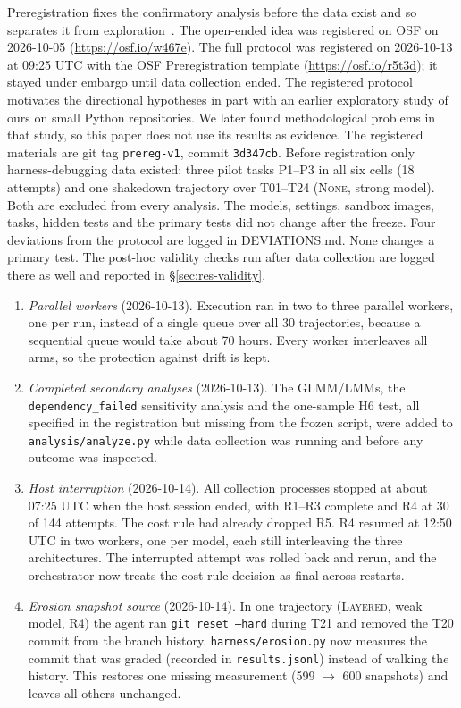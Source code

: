 \documentclass[10pt]{article}
\newcommand{\NONE}{\textsc{None}}
\newcommand{\LAY}{\textsc{Layered}}
\newcommand{\code}[1]{\texttt{#1}}
\begin{document}
Preregistration fixes the confirmatory analysis before the data exist and so separates it from exploration~\citep{nosek2018preregistration}. The open-ended idea was registered on OSF on 2026-10-05 (\url{https://osf.io/w467e}). The full
protocol was registered on 2026-10-13 at 09:25 UTC with the OSF Preregistration template
(\url{https://osf.io/r5t3d}); it stayed under embargo until data collection ended. The registered protocol motivates the
directional hypotheses in part with an earlier exploratory study of ours on small Python
repositories. We later found methodological problems in that study, so this paper does not use its
results as evidence. The registered materials are git tag
\code{prereg-v1}, commit \code{3d347cb}. Before registration only harness-debugging data existed:
three pilot tasks P1--P3 in all six cells (18 attempts) and one shakedown trajectory over T01--T24
(\NONE, strong model). Both are excluded from every analysis. The models, settings, sandbox
images, tasks, hidden tests and the primary tests did not change after the freeze. Four deviations
from the protocol are logged in DEVIATIONS.md. None changes a primary test. The post-hoc validity
checks run after data collection are logged there as well and reported in \S\ref{sec:res-validity}.
\begin{enumerate}[itemsep=1pt]
  \item \emph{Parallel workers} (2026-10-13). Execution ran in two to three parallel workers, one
    per run, instead of a single queue over all 30 trajectories, because a sequential queue would
    take about 70 hours. Every worker interleaves all arms, so the protection against drift is kept.
  \item \emph{Completed secondary analyses} (2026-10-13). The GLMM/LMMs, the
    \code{dependency\_failed} sensitivity analysis and the one-sample H6 test, all specified in the
    registration but missing from the frozen script, were added to \code{analysis/analyze.py}
    while data collection was running and before any outcome was inspected.
  \item \emph{Host interruption} (2026-10-14). All collection processes stopped at about 07:25 UTC
    when the host session ended, with R1--R3 complete and R4 at 30 of 144 attempts. The cost rule
    had already dropped R5. R4 resumed at 12:50 UTC in two workers, one per model, each still
    interleaving the three architectures. The interrupted attempt was rolled back and rerun, and
    the orchestrator now treats the cost-rule decision as final across restarts.
  \item \emph{Erosion snapshot source} (2026-10-14). In one trajectory (\LAY, weak model, R4) the
    agent ran \code{git reset --hard} during T21 and removed the T20 commit from the branch history.
    \code{harness/erosion.py} now measures the commit that was graded (recorded in
    \code{results.jsonl}) instead of walking the history. This restores one missing measurement
    (599 $\rightarrow$ 600 snapshots) and leaves all others unchanged.
\end{enumerate}
\end{document}
